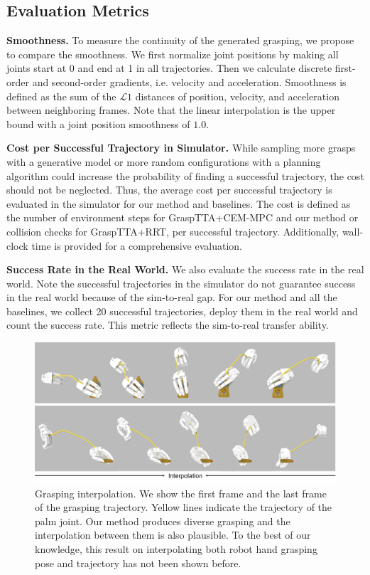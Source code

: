 \documentclass[letterpaper, 10 pt, journal, twoside]{IEEEtran}
\begin{document}
\vspace{-0.05in}
\subsection{Evaluation Metrics}

\textbf{Smoothness.} To measure the continuity of the generated grasping, we propose to compare the smoothness. We first normalize joint positions by making all joints start at 0 and end at 1 in all trajectories. Then we calculate discrete first-order and second-order gradients, i.e. velocity and acceleration. Smoothness is defined as the sum of the $\mathcal{L}1$ distances of position, velocity, and acceleration between neighboring frames.
Note that the linear interpolation is the upper bound with a joint position smoothness of $1.0$.

\textbf{Cost per Successful Trajectory in Simulator.}
While sampling more grasps with a generative model or more random configurations with a planning algorithm could increase the probability of finding a successful trajectory, the cost should not be neglected.
Thus, the average cost per successful trajectory is evaluated in the simulator for our method and baselines. The cost is defined as the number of environment steps for GraspTTA+CEM-MPC and our method or collision checks for GraspTTA+RRT, per successful trajectory. Additionally, wall-clock time is provided for a comprehensive evaluation.

\textbf{Success Rate in the Real World.} We also evaluate the success rate in the real world. Note the successful trajectories in the simulator do not guarantee success in the real world because of the sim-to-real gap. For our method and all the baselines, we collect 20 successful trajectories, deploy them in the real world and count the success rate. This metric reflects the sim-to-real transfer ability.

\begin{figure}[t]
\centering
  \vspace{-0.1in}
  \includegraphics[width=0.9\linewidth]{figure/interpolation_new.pdf}
  \vspace{-0.2in}
  \caption{\small
  Grasping interpolation. We show the first frame and the last frame of the grasping trajectory. Yellow lines indicate the trajectory of the palm joint. Our method produces diverse grasping and the interpolation between them is also plausible. To the best of our knowledge, this result on interpolating both robot hand grasping pose and trajectory has not been shown before.}
  \vspace{-0.2in}
  \label{fig:interpolation}
\end{figure}
\end{document}

